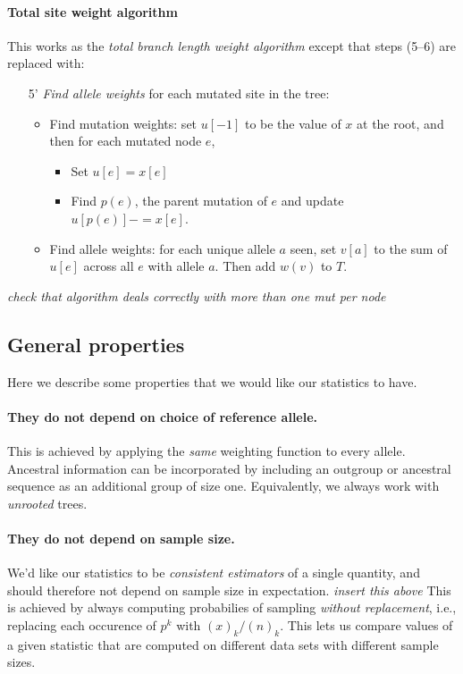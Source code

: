 \documentclass{article}
\newcommand{\plr}[1]{{\color{blue} \it #1}}
\begin{document}
\paragraph{Total site weight algorithm}
This works as the \emph{total branch length weight algorithm} except that steps (5--6) are replaced with:
\begin{itemize}
    \item[5'] \emph{Find allele weights} for each mutated site in the tree:
        \begin{itemize}
            \item Find mutation weights: 
                    set $u[-1]$ to be the value of $x$ at the root,
                    and then for each mutated node $e$,
                \begin{itemize}
                    \item Set $u[e] = x[e]$ 
                    \item Find $p(e)$, the parent mutation of $e$
                        and update $u[p(e)] -= x[e]$.
                \end{itemize}
            \item Find allele weights: for each unique allele $a$ seen,
                set $v[a]$ to the sum of $u[e]$ across all $e$ with allele $a$.
                Then add $w(v)$ to $T$.
        \end{itemize}
\end{itemize}
\plr{check that algorithm deals correctly with more than one mut per node}

\subsection*{General properties}

Here we describe some properties that we would like our statistics to have.

\paragraph{They do not depend on choice of reference allele.}
This is achieved by applying the \emph{same} weighting function to every allele.
Ancestral information can be incorporated by including an outgroup or ancestral sequence
as an additional group of size one.
Equivalently, we always work with \emph{unrooted} trees.

\paragraph{They do not depend on sample size.}
We'd like our statistics to be \emph{consistent estimators}
of a single quantity, and should therefore not depend on sample size in expectation.
\plr{insert this above}
This is achieved by always computing probabilies of sampling \emph{without replacement},
i.e., replacing each occurence of $p^k$ with $(x)_k/(n)_k$.
This lets us compare values of a given statistic
that are computed on different data sets with different sample sizes.
\end{document}

